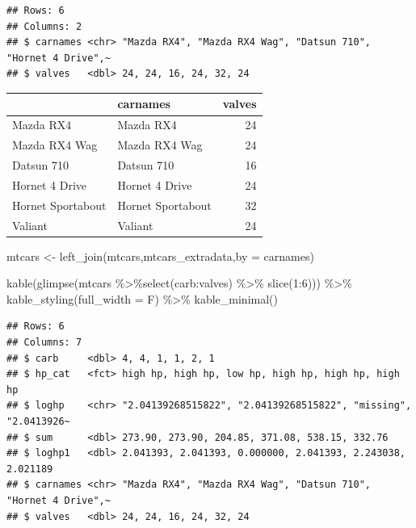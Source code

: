 \documentclass[
]{book}
\newenvironment{Shaded}{\begin{snugshade}}{\end{snugshade}}
\newcommand{\AttributeTok}[1]{\textcolor[rgb]{0.77,0.63,0.00}{#1}}
\newcommand{\DecValTok}[1]{\textcolor[rgb]{0.00,0.00,0.81}{#1}}
\newcommand{\FunctionTok}[1]{\textcolor[rgb]{0.00,0.00,0.00}{#1}}
\newcommand{\NormalTok}[1]{#1}
\newcommand{\OtherTok}[1]{\textcolor[rgb]{0.56,0.35,0.01}{#1}}
\newcommand{\SpecialCharTok}[1]{\textcolor[rgb]{0.00,0.00,0.00}{#1}}
\newcommand{\StringTok}[1]{\textcolor[rgb]{0.31,0.60,0.02}{#1}}
\begin{document}
\begin{verbatim}
## Rows: 6
## Columns: 2
## $ carnames <chr> "Mazda RX4", "Mazda RX4 Wag", "Datsun 710", "Hornet 4 Drive",~
## $ valves   <dbl> 24, 24, 16, 24, 32, 24
\end{verbatim}

\begin{table}
\centering
\begin{tabular}{l|l|r}
\hline
  & carnames & valves\\
\hline
Mazda RX4 & Mazda RX4 & 24\\
\hline
Mazda RX4 Wag & Mazda RX4 Wag & 24\\
\hline
Datsun 710 & Datsun 710 & 16\\
\hline
Hornet 4 Drive & Hornet 4 Drive & 24\\
\hline
Hornet Sportabout & Hornet Sportabout & 32\\
\hline
Valiant & Valiant & 24\\
\hline
\end{tabular}
\end{table}

\begin{Shaded}
\begin{Highlighting}[]
\NormalTok{mtcars }\OtherTok{\textless{}{-}} \FunctionTok{left\_join}\NormalTok{(mtcars,mtcars\_extradata,}\AttributeTok{by =} \StringTok{\textquotesingle{}carnames\textquotesingle{}}\NormalTok{)}

\FunctionTok{kable}\NormalTok{(}\FunctionTok{glimpse}\NormalTok{(mtcars }\SpecialCharTok{\%\textgreater{}\%}\FunctionTok{select}\NormalTok{(carb}\SpecialCharTok{:}\NormalTok{valves) }\SpecialCharTok{\%\textgreater{}\%}  \FunctionTok{slice}\NormalTok{(}\DecValTok{1}\SpecialCharTok{:}\DecValTok{6}\NormalTok{))) }\SpecialCharTok{\%\textgreater{}\%} \FunctionTok{kable\_styling}\NormalTok{(}\AttributeTok{full\_width =}\NormalTok{ F) }\SpecialCharTok{\%\textgreater{}\%}
  \FunctionTok{kable\_minimal}\NormalTok{()}
\end{Highlighting}
\end{Shaded}

\begin{verbatim}
## Rows: 6
## Columns: 7
## $ carb     <dbl> 4, 4, 1, 1, 2, 1
## $ hp_cat   <fct> high hp, high hp, low hp, high hp, high hp, high hp
## $ loghp    <chr> "2.04139268515822", "2.04139268515822", "missing", "2.0413926~
## $ sum      <dbl> 273.90, 273.90, 204.85, 371.08, 538.15, 332.76
## $ loghp1   <dbl> 2.041393, 2.041393, 0.000000, 2.041393, 2.243038, 2.021189
## $ carnames <chr> "Mazda RX4", "Mazda RX4 Wag", "Datsun 710", "Hornet 4 Drive",~
## $ valves   <dbl> 24, 24, 16, 24, 32, 24
\end{verbatim}
\end{document}
